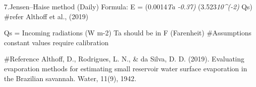 \documentclass[
]{article}
\newenvironment{Shaded}{\begin{snugshade}}{\end{snugshade}}
\newcommand{\CommentTok}[1]{\textcolor[rgb]{0.56,0.35,0.01}{\textit{#1}}}
\newcommand{\DecValTok}[1]{\textcolor[rgb]{0.00,0.00,0.81}{#1}}
\newcommand{\FloatTok}[1]{\textcolor[rgb]{0.00,0.00,0.81}{#1}}
\newcommand{\NormalTok}[1]{#1}
\newcommand{\OtherTok}[1]{\textcolor[rgb]{0.56,0.35,0.01}{#1}}
\newcommand{\SpecialCharTok}[1]{\textcolor[rgb]{0.00,0.00,0.00}{#1}}
\begin{document}
\begin{Shaded}
\end{Shaded}

7.Jensen--Haise method (Daily) Formula: E = (0.0014\emph{Ta -0.37)}
(3.523\emph{10\^{}(-2) } Qs) \#refer Althoff et al., (2019)

Qs = Incoming radiations (W m-2) Ta should be in F (Farenheit)
\#Assumptions constant values require calibration

\#Reference Althoff, D., Rodrigues, L. N., \& da Silva, D. D. (2019).
Evaluating evaporation methods for estimating small reservoir water
surface evaporation in the Brazilian savannah. Water, 11(9), 1942.
\end{document}
